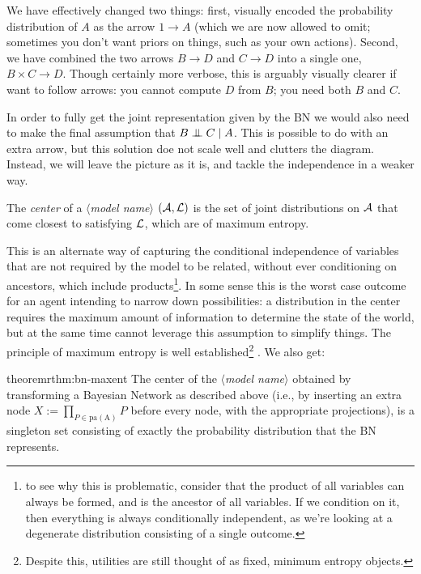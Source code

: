 \documentclass{article}
\newcommand\modelname{{\color{blue!50!black}$\langle$\itshape model name$\rangle$ }}
\begin{document}
	We have effectively changed two things: first, visually encoded the probability distribution of $A$ as the arrow $1 \to A$ (which we are now allowed to omit; sometimes you don't want priors on things, such as your own actions). Second, we have combined the two arrows $B \to D$ and $C \to D$ into a single one, $B \times C \to D$. Though certainly more verbose, this is arguably visually clearer if want to follow arrows: you cannot compute $D$ from $B$; you need both $B$ and $C$.
	
	In order to fully get the joint representation given by the BN we would also need to make the final assumption that $B \mathrel{\perp\mspace{-10mu}\perp} C \mid A$. This is possible to do with an extra arrow, but this solution doe not scale well and clutters the diagram. Instead, we will leave the picture as it is, and tackle the independence in a weaker way.
	
	\begin{defn*}
		The \emph{center} of a \modelname $(\cal A, L)$ is the set of joint distributions on $\cal A$ that come closest to satisfying $\cal L$, which are of maximum entropy.
	\end{defn*}

	This is an alternate way of capturing the conditional independence of variables that are not required by the model to be related, without ever conditioning on ancestors, which include products\footnote{to see why this is problematic, consider that the product of all variables can always be formed, and is the ancestor of all variables. If we condition on it, then everything is always conditionally independent, as we're looking at a degenerate distribution consisting of a single outcome.}.  In some sense this is the worst case outcome for an agent intending to narrow down possibilities: a distribution in the center requires the maximum amount of information to determine the state of the world, but at the same time cannot leverage this assumption to simplify things. The principle of maximum entropy is well established\footnote{Despite this, utilities are still thought of as fixed, minimum entropy objects.} . We also get:
	
	
	\begin{restatable}{theorem}{rthm:bn-maxent} \label{rthm:bn-maxent}
		The center of the \modelname obtained by transforming a Bayesian Network as described above (i.e., by inserting an extra node $X := \prod_{P \in \mathrm{pa(A)}} P$ before every node, with the appropriate projections), is a singleton set consisting of exactly the probability distribution that the BN represents.
	\end{restatable}
	
\end{document}
